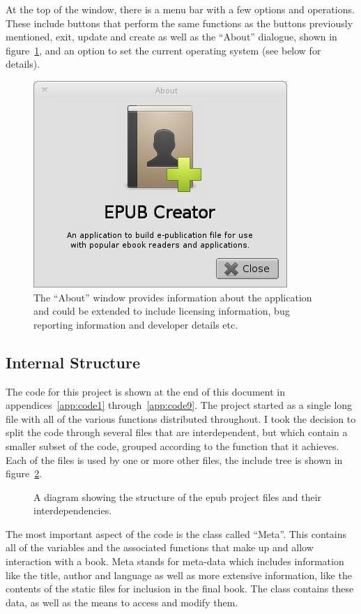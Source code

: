 \documentclass[11pt]{article} %
\newcommand{\inputTikZ}[1]{%
  }
\newcommand{\inputTikZ}[1]{%
    \beginpgfgraphicnamed{#1-external}%
    \endpgfgraphicnamed%
  }
\begin{document}
At the top of the window, there is a menu bar with a few options and operations. These include buttons that perform the same functions as the buttons previously mentioned, exit, update and create as well as the ``About'' dialogue, shown in figure~\ref{fig:about}, and an option to set the current operating system (see below for details).
\begin{figure}[ht]
  \centering
  \includegraphics[width=0.35\columnwidth]{about.png}
  \caption{\label{fig:about}The ``About'' window provides information about the application and could be extended to include licensing information, bug reporting information and developer details etc.}
\end{figure}

\subsection{Internal Structure}
The code for this project is shown at the end of this document in appendices~\ref{app:code1} through~\ref{app:code9}. The project started as a single long file with all of the various functions distributed throughout. I took the decision to split the code through several files that are interdependent, but which contain a smaller subset of the code, grouped according to the function that it achieves. Each of the files is used by one or more other files, the include tree is shown in figure~\ref{fig:files}.
\begin{figure}[ht]
  \centering
    \inputTikZ{files}
  \caption{\label{fig:files}A diagram showing the structure of the epub project files and their interdependencies.}
\end{figure}

The most important aspect of the code is the class called ``Meta''. This contains all of the variables and the associated functions that make up and allow interaction with a book. Meta stands for meta-data which includes information like the title, author and language as well as more extensive information, like the contents of the static files for inclusion in the final book. The class contains these data, as well as the means to access and modify them.
\end{document}
